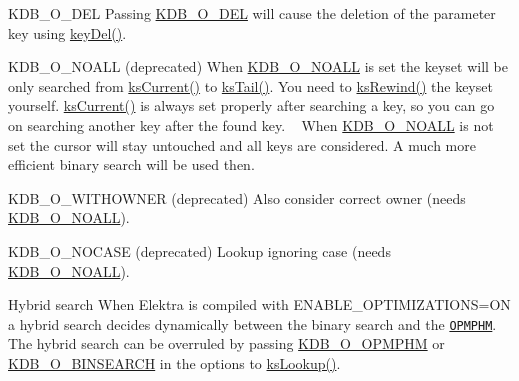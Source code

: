 \begin{DoxyParagraph}{K\+D\+B\+\_\+\+O\+\_\+\+D\+EL}
Passing \hyperlink{group__keyset_gga98a3d6a4016c9dad9cbd1a99a9c2a45aa66a5380c120f25f28f49848c4a863ead}{K\+D\+B\+\_\+\+O\+\_\+\+D\+EL} will cause the deletion of the parameter {\ttfamily key} using \hyperlink{group__key_ga3df95bbc2494e3e6703ece5639be5bb1}{key\+Del()}.
\end{DoxyParagraph}
\begin{DoxyParagraph}{K\+D\+B\+\_\+\+O\+\_\+\+N\+O\+A\+LL (deprecated)}
When \hyperlink{group__keyset_gga98a3d6a4016c9dad9cbd1a99a9c2a45aae8dd1961707e7d0c27228a3f98b0a94d}{K\+D\+B\+\_\+\+O\+\_\+\+N\+O\+A\+LL} is set the keyset will be only searched from \hyperlink{group__keyset_ga4287b9416912c5f2ab9c195cb74fb094}{ks\+Current()} to \hyperlink{group__keyset_gadca442c4ab43cf532b15091d7711559e}{ks\+Tail()}. You need to \hyperlink{group__keyset_gabe793ff51f1728e3429c84a8a9086b70}{ks\+Rewind()} the keyset yourself. \hyperlink{group__keyset_ga4287b9416912c5f2ab9c195cb74fb094}{ks\+Current()} is always set properly after searching a key, so you can go on searching another key after the found key. ~\newline
When \hyperlink{group__keyset_gga98a3d6a4016c9dad9cbd1a99a9c2a45aae8dd1961707e7d0c27228a3f98b0a94d}{K\+D\+B\+\_\+\+O\+\_\+\+N\+O\+A\+LL} is not set the cursor will stay untouched and all keys are considered. A much more efficient binary search will be used then.
\end{DoxyParagraph}
\begin{DoxyParagraph}{K\+D\+B\+\_\+\+O\+\_\+\+W\+I\+T\+H\+O\+W\+N\+ER (deprecated)}
Also consider correct owner (needs \hyperlink{group__keyset_gga98a3d6a4016c9dad9cbd1a99a9c2a45aae8dd1961707e7d0c27228a3f98b0a94d}{K\+D\+B\+\_\+\+O\+\_\+\+N\+O\+A\+LL}).
\end{DoxyParagraph}
\begin{DoxyParagraph}{K\+D\+B\+\_\+\+O\+\_\+\+N\+O\+C\+A\+SE (deprecated)}
Lookup ignoring case (needs \hyperlink{group__keyset_gga98a3d6a4016c9dad9cbd1a99a9c2a45aae8dd1961707e7d0c27228a3f98b0a94d}{K\+D\+B\+\_\+\+O\+\_\+\+N\+O\+A\+LL}).
\end{DoxyParagraph}
\begin{DoxyParagraph}{Hybrid search}
When Elektra is compiled with {\ttfamily E\+N\+A\+B\+L\+E\+\_\+\+O\+P\+T\+I\+M\+I\+Z\+A\+T\+I\+O\+NS=ON} a hybrid search decides dynamically between the binary search and the \href{https://master.libelektra.org/doc/dev/data-structures.md#order-preserving-minimal-perfect-hash-map-aka-opmphm}{\tt O\+P\+M\+P\+HM}. The hybrid search can be overruled by passing \hyperlink{group__proposal_gga93673533c4c8eb1fdfca76b98c5f49b0afe9f6ff6e374540baf600a918b07ee6e}{K\+D\+B\+\_\+\+O\+\_\+\+O\+P\+M\+P\+HM} or \hyperlink{group__proposal_gga93673533c4c8eb1fdfca76b98c5f49b0ac67a43bd273203575090d26010f6c995}{K\+D\+B\+\_\+\+O\+\_\+\+B\+I\+N\+S\+E\+A\+R\+CH} in the options to \hyperlink{group__keyset_gaa34fc43a081e6b01e4120daa6c112004}{ks\+Lookup()}.
\end{DoxyParagraph}

